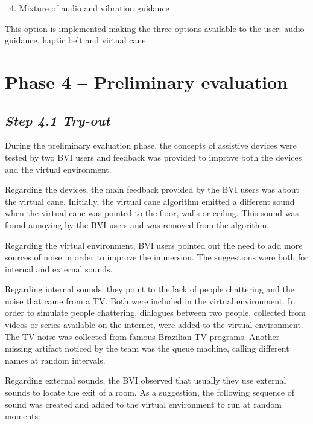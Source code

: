         \begin{enumerate} [label = \Alph*)]
            \setcounter{enumi}{3}
            \item Mixture of audio and vibration guidance
        \end{enumerate}

        This option is implemented making the three options available to the user: audio guidance, haptic belt and virtual cane. 


\section{Phase 4 – Preliminary evaluation}
\label{sec:tests_phase}
        
\subsection*{\textit{Step 4.1 Try-out}}

        During the preliminary evaluation phase, the concepts of assistive devices were tested by two BVI users and feedback was provided to improve both the devices and the virtual environment. 

        Regarding the devices, the main feedback provided by the BVI users was about the virtual cane. Initially, the virtual cane algorithm emitted a different sound when the virtual cane was pointed to the floor, walls or ceiling. This sound was found annoying by the BVI users and was removed from the algorithm.

        Regarding the virtual environment, BVI users pointed out the need to add more sources of noise in order to improve the immersion. The suggestions were both for internal and external sounds.
        
        Regarding internal sounds, they point to the lack of people chattering and the noise that came from a TV. Both were included in the virtual environment. In order to simulate people chattering, dialogues between two people, collected from videos or series available on the internet, were added to the virtual environment. The TV noise was collected from famous Brazilian TV programs. Another missing artifact noticed by the team was the queue machine, calling different names at random intervals. 

        Regarding external sounds, the BVI observed that usually they use external sounds to locate the exit of a room. As a suggestion, the following sequence of sound was created and added to the virtual environment to run at random moments:

